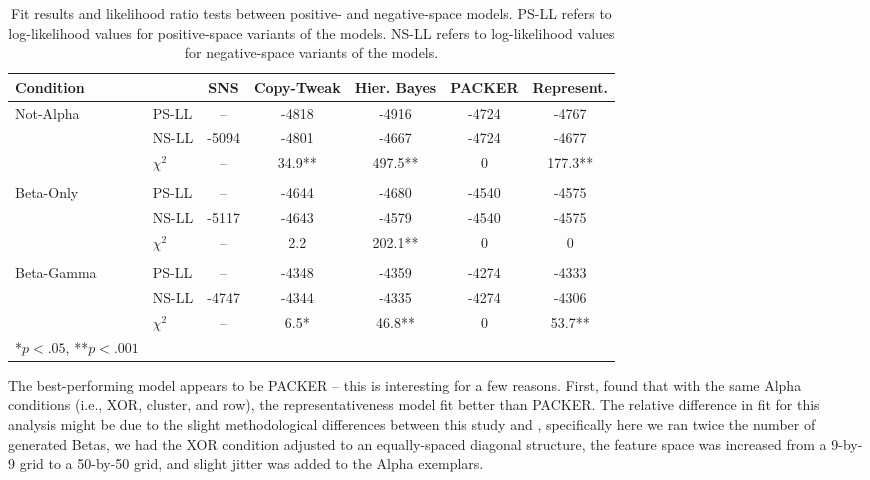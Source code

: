 \documentclass[12pt]{article}
\begin{document}
\begin{flushleft}
\begin{table}
\begin{center} 
  \caption{Fit results and likelihood ratio tests between positive- and negative-space models. PS-LL refers to
    log-likelihood values for positive-space variants of the models. NS-LL refers to log-likelihood values for
    negative-space variants of the models. }
\label{table:lrtest} 
\begin{tabular}{llccccc} 
\hline
Condition & &SNS&  Copy-Tweak & Hier. Bayes & PACKER & Represent. \\
\hline
Not-Alpha & PS-LL    & --     & -4818  & -4916   & -4724 & -4767   \\
          & NS-LL    & -5094  & -4801  & -4667   & -4724 & -4677   \\
          & $\chi^2$ & --     & 34.9** & 497.5** & 0     & 177.3** \\
          &          &        &        &         &       &         \\
Beta-Only & PS-LL    & --     & -4644  & -4680   & -4540 & -4575   \\
          & NS-LL    & -5117  & -4643  & -4579   & -4540 & -4575   \\
          & $\chi^2$ & --     &  2.2   & 202.1** & 0     &   0     \\
          &          &        &        &         &       &         \\
Beta-Gamma& PS-LL    & --     & -4348  & -4359   & -4274 & -4333   \\
          & NS-LL    & -4747  & -4344  & -4335   & -4274 & -4306   \\
          & $\chi^2$ & --     &  6.5*  &  46.8** & 0     &  53.7** \\
\hline
*$p<.05$, **$p<.001$
\end{tabular} 
\end{center} 
\end{table}

The best-performing model appears to be PACKER -- this is interesting for a few reasons. First,
\cite{austerweil2019catgen} found that with the same Alpha conditions (i.e., XOR, cluster, and row), the
representativeness model fit better than PACKER. The relative difference in fit for this analysis might be due to the
slight methodological differences between this study and \cite{austerweil2019catgen}, specifically here we ran twice
the number of generated Betas, we had the XOR condition adjusted to an equally-spaced diagonal structure, the feature
space was increased from a 9-by-9 grid to a 50-by-50 grid, and slight jitter was added to the Alpha exemplars. 


\end{flushleft}
\end{document}
